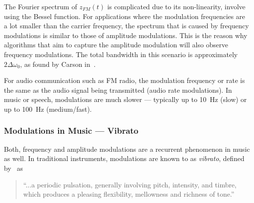 The Fourier spectrum of $z_{FM}(t)$ is complicated due to its non-linearity, involve using the Bessel function.
For applications where the modulation frequencies are a lot smaller than the carrier frequency, the spectrum that is caused by frequency modulations is similar to those of amplitude modulations.
This is the reason why algorithms that aim to capture the amplitude modulation will also observe frequency modulations.
The total bandwidth in this scenario is approximately $2\Delta \omega_0$, as found by Carson in~\cite{carson22}.\par
For audio communication such as FM radio, the modulation frequency or rate is the same as the audio signal being transmitted (audio rate modulations).
In music or speech, modulations are much slower --- typically up to 10~\si{\hertz} (slow) or up to 100~\si{\hertz} (medium/fast).

\subsubsection*{Modulations in Music --- Vibrato}

Both, frequency and amplitude modulations are a recurrent phenomenon in music as well.
In traditional instruments, modulations are known to as \emph{vibrato}, defined by~\cite{seashore31} as

\begin{quote}
``...a periodic pulsation, generally involving pitch, intensity, and timbre, which produces a pleasing flexibility, mellowness and richness of tone.''
\end{quote}

